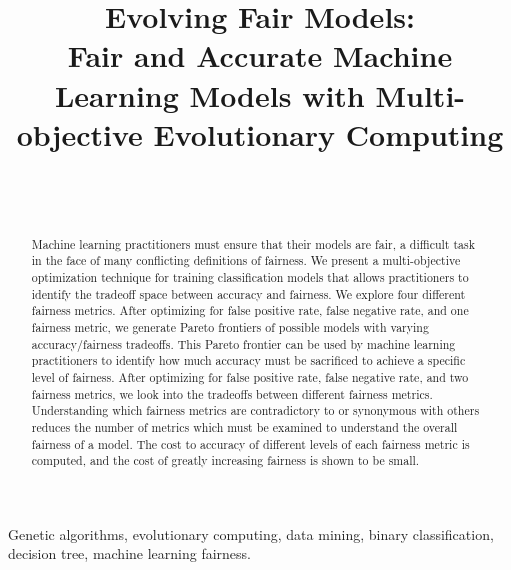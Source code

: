 \documentclass[twoside]{article}
\begin{document}
\title{\bf Evolving Fair Models: \\
Fair and Accurate Machine Learning Models with Multi-objective Evolutionary Computing}  

\author{ \hfill {}\\ 
\AND
        \hfill {}\\
}

\maketitle

\begin{abstract}

Machine learning practitioners must ensure that their models are fair, a difficult task in the face of many conflicting definitions of fairness. We present a multi-objective optimization technique for training classification models that allows practitioners to identify the tradeoff space between accuracy and fairness. We explore four different fairness metrics. After optimizing for false positive rate, false negative rate, and one fairness metric, we generate Pareto frontiers of possible models with varying accuracy/fairness tradeoffs. This Pareto frontier can be used by machine learning practitioners to identify how much accuracy must be sacrificed to achieve a specific level of fairness. After optimizing for false positive rate, false negative rate, and two fairness metrics, we look into the tradeoffs between different fairness metrics. Understanding which fairness metrics are contradictory to or synonymous with others reduces the number of metrics which must be examined to understand the overall fairness of a model. The cost to accuracy of different levels of each fairness metric is computed, and the cost of greatly increasing fairness is shown to be small.
\end{abstract}

\begin{keywords}

Genetic algorithms, 
evolutionary computing,
data mining, 
binary classification, 
decision tree, 
machine learning fairness.

\end{keywords}
\end{document}
